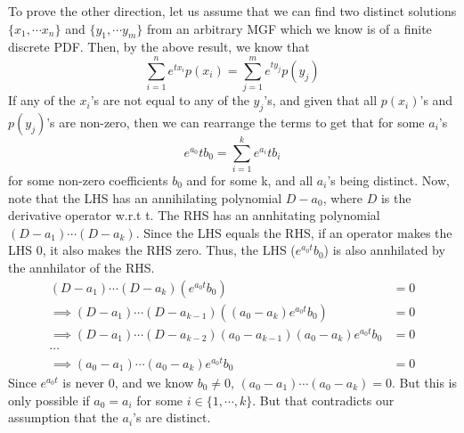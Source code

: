To prove the other direction, let us assume that we can find two distinct solutions $\{x_1,\cdots x_n\}$ and $\{y_1,\cdots y_m\}$ from an arbitrary MGF which we know is of a finite discrete PDF. Then, by the above result, we know that
\[
    \sum_{i=1}^n e^{tx_i} p(x_i) = \sum_{j=1}^m e^{ty_j} p(y_j)
\]
If any of the $x_i$'s are not equal to any of the $y_j$'s, and given that all $p(x_i)$'s and $p(y_j)$'s are non-zero, then we can rearrange the terms to get that for some $a_i$'s
\[
    e^{a_0}t b_0 = \sum_{i=1}^k e^{a_i}t b_i
\]
for some non-zero coefficients $b_0$ and for some k, and all $a_i$'s being distinct. Now, note that the LHS has an annihilating polynomial $D-a_0$, where $D$ is the derivative operator w.r.t t. The RHS has an annhitating polynomial $(D-a_1)\cdots(D-a_k)$. Since the LHS equals the RHS, if an operator makes the LHS 0, it also makes the RHS zero. Thus, the LHS ($e^{a_0t}b_0$) is also annhilated by the annhilator of the RHS.
\begin{align*}
    (D-a_1)\cdots(D-a_k)(e^{a_0t}b_0) &= 0\\
    \implies (D-a_1)\cdots(D-a_{k-1})((a_0-a_k)e^{a_0t}b_0) &= 0\\
    \implies (D-a_1)\cdots(D-a_{k-2})(a_0-a_{k-1})(a_0-a_k)e^{a_0t}b_0 &= 0\\
    \cdots\\
    \implies (a_0-a_1)\cdots(a_0-a_k)e^{a_0t}b_0 &= 0
\end{align*}
Since $e^{a_0t}$ is never 0, and we know $b_0\ne 0$, $(a_0-a_1)\cdots(a_0-a_k)=0$. But this is only possible if $a_0 = a_i$ for some $i \in \{1,\cdots, k\}$. But that contradicts our assumption that the $a_i$'s are distinct.